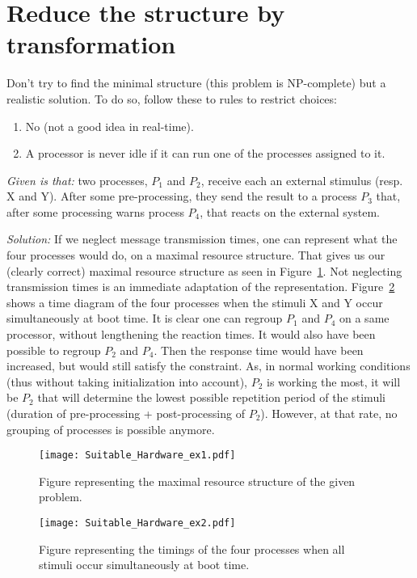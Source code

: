 \documentclass[../main.tex]{subfiles}
\begin{document}
\section{Reduce the structure by transformation}
Don't try to find the minimal structure (this problem is NP-complete) but a realistic solution. To do so, follow these to rules to restrict choices:
\begin{enumerate}
	\item No  (not a good idea in real-time).
	\item A processor is never idle if it can run one of the processes assigned to it.
\end{enumerate}

\begin{exmp}
\emph{Given is that:} two processes, $P_1$ and $P_2$, receive each an external stimulus (resp. X and Y). After some pre-processing, they send the result to a process $P_3$ that, after some processing warns process $P_4$, that reacts on the external system. 

\emph{Solution:} If we neglect message transmission times, one can represent what the four processes would do, on a maximal resource structure.
That gives us our (clearly correct) maximal resource structure as seen in Figure~\ref{f:sh_ex1}.
Not neglecting transmission times is an immediate adaptation of the representation.
Figure~\ref{f:sh_ex2} shows a time diagram of the four processes when the stimuli X and Y occur simultaneously at boot time. It is clear one can regroup $P_1$ and $P_4$ on a same processor, without lengthening the reaction times. It would also have been possible to regroup $P_2$ and $P_4$. Then the response time would have been increased, but would still satisfy the constraint.
As, in normal working conditions (thus without taking initialization into account), $P_2$ is working the most, it will be $P_2$ that will determine the lowest possible repetition period of the stimuli (duration of pre-processing + post-processing of $P_2$). However, at that rate, no grouping of processes is possible anymore.

\begin{figure}[H]
	\texttt{[image: Suitable\_Hardware\_ex1.pdf]}
	\caption{Figure representing the maximal resource structure of the given problem.}
	\label{f:sh_ex1}
\end{figure}

\begin{figure}[H]
	\texttt{[image: Suitable\_Hardware\_ex2.pdf]}
	\caption{Figure representing the timings of the four processes when all stimuli occur simultaneously at boot time.}
	\label{f:sh_ex2}
\end{figure}
\end{exmp}
\end{document}
